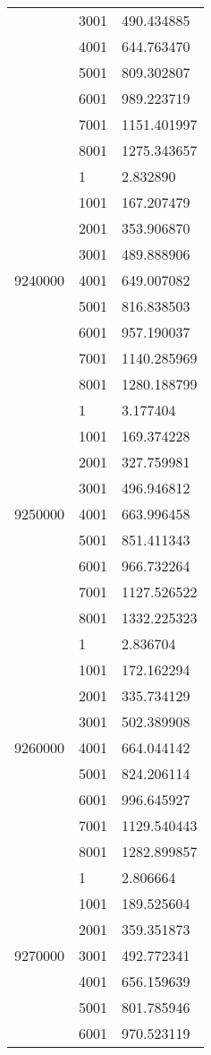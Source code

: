 \begin{table}[htb!]
\begin{tabular}{lll}
 & 3001 & 490.434885 \\
 & 4001 & 644.763470 \\
 & 5001 & 809.302807 \\
 & 6001 & 989.223719 \\
 & 7001 & 1151.401997 \\
 & 8001 & 1275.343657 \\
\multirow[c]{9}{*}{9240000} & 1 & 2.832890 \\
 & 1001 & 167.207479 \\
 & 2001 & 353.906870 \\
 & 3001 & 489.888906 \\
 & 4001 & 649.007082 \\
 & 5001 & 816.838503 \\
 & 6001 & 957.190037 \\
 & 7001 & 1140.285969 \\
 & 8001 & 1280.188799 \\
\multirow[c]{9}{*}{9250000} & 1 & 3.177404 \\
 & 1001 & 169.374228 \\
 & 2001 & 327.759981 \\
 & 3001 & 496.946812 \\
 & 4001 & 663.996458 \\
 & 5001 & 851.411343 \\
 & 6001 & 966.732264 \\
 & 7001 & 1127.526522 \\
 & 8001 & 1332.225323 \\
\multirow[c]{9}{*}{9260000} & 1 & 2.836704 \\
 & 1001 & 172.162294 \\
 & 2001 & 335.734129 \\
 & 3001 & 502.389908 \\
 & 4001 & 664.044142 \\
 & 5001 & 824.206114 \\
 & 6001 & 996.645927 \\
 & 7001 & 1129.540443 \\
 & 8001 & 1282.899857 \\
\multirow[c]{9}{*}{9270000} & 1 & 2.806664 \\
 & 1001 & 189.525604 \\
 & 2001 & 359.351873 \\
 & 3001 & 492.772341 \\
 & 4001 & 656.159639 \\
 & 5001 & 801.785946 \\
 & 6001 & 970.523119 \\

\end{tabular}
\end{table}
